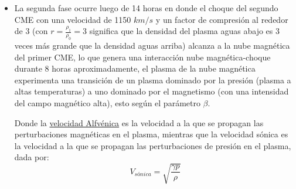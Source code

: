 \begin{itemize}
\begin{itemize}
\item La segunda fase ocurre luego de 14 horas en donde el choque del segundo \ac{CME} con una velocidad de 1150 $km/s$ y un factor de compresión al rededor de 3 (con $r=\frac{\rho_{1}}{\rho_{0}}=3$ significa que la densidad del plasma aguas abajo es 3 veces más grande que la densidad aguas arriba) alcanza a la nube magnética del primer CME, lo que genera una interacción nube magnética-choque durante 8 horas aproximadamente, el plasma de la nube magnética experimenta una transición de un plasma dominado por la presión (plasma a altas temperaturas) a uno dominado por el magnetismo (con una intensidad del campo magnético alta), esto según el parámetro \hyperref[beta]{$\beta$}. 

Donde la \hyperref[Valfvenica]{velocidad Alfvénica} es la velocidad a la que se propagan las perturbaciones magnéticas en el plasma, mientras que la velocidad sónica es la velocidad a la que se propagan las perturbaciones de presión en el plasma, dada por:
\begin{equation}
    V_{sónica}=\sqrt{ \frac{\gamma p}{\rho} }
\end{equation}


\end{itemize}
\end{itemize}
